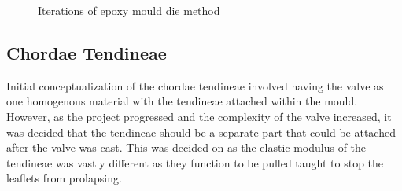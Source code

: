 \begin{figure}
    \begin{fullwidth}
        \centering
        \quad
        \quad
        \quad
        \caption{Iterations of epoxy mould die method}
        \label{fig:moulddie}
    \end{fullwidth}
\end{figure}


\subsection{Chordae Tendineae}
Initial conceptualization of the chordae tendineae involved having the valve as one homogenous material with the tendineae attached within the mould. However, as the project progressed and the complexity of the valve increased, it was decided that the tendineae should be a separate part that could be attached after the valve was cast. This was decided on as the elastic modulus of the tendineae was vastly different as they function to be pulled taught to stop the leaflets from prolapsing.

